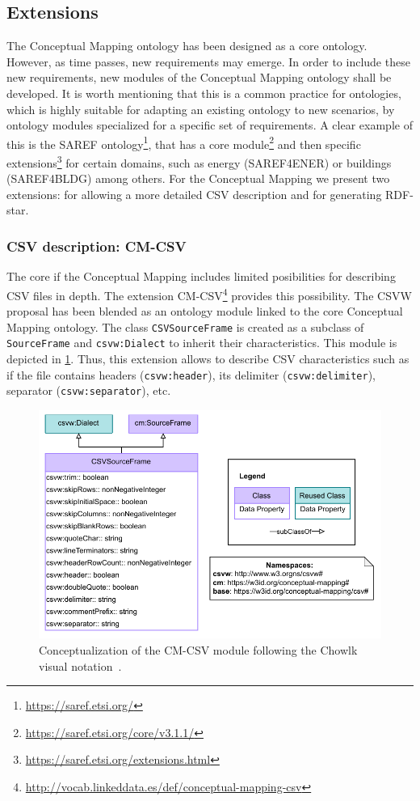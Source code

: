 \subsection{Extensions}

The Conceptual Mapping ontology has been designed as a core ontology. However, as time passes, new requirements may emerge. In order to include these new requirements, new modules of the Conceptual Mapping ontology shall be developed. It is worth mentioning that this is a common practice for ontologies, which is highly suitable for adapting an existing ontology to new scenarios, by ontology modules specialized for a specific set of requirements. A clear example of this is the SAREF ontology\footnote{\url{https://saref.etsi.org/}}, that has a core module\footnote{\url{https://saref.etsi.org/core/v3.1.1/}} and then specific extensions\footnote{\url{https://saref.etsi.org/extensions.html}} for certain domains, such as energy (SAREF4ENER) or buildings (SAREF4BLDG) among others. For the Conceptual Mapping we present two extensions: for allowing a more detailed CSV description and for generating RDF-star.

\subsubsection{CSV description: CM-CSV}
The core if the Conceptual Mapping includes limited posibilities for describing CSV files in depth. The extension CM-CSV\footnote{\url{http://vocab.linkeddata.es/def/conceptual-mapping-csv}} provides this possibility. The CSVW proposal has been blended as an ontology module linked to the core Conceptual Mapping ontology. The class \texttt{CSVSourceFrame} is created as a subclass of \texttt{SourceFrame} and \texttt{csvw:Dialect} to inherit their characteristics. This module is depicted in \cref{fig:chp4-2_csv-ext}. Thus, this extension allows to describe CSV characteristics such as if the file contains headers (\texttt{csvw:header}), its delimiter (\texttt{csvw:delimiter}), separator (\texttt{csvw:separator}), etc. 


\begin{figure}[!t]
\centering
\includegraphics[width=0.8\linewidth]{figures/chp4-2_cm-csv.pdf}
\caption[CM-CSV module]{Conceptualization of the CM-CSV module following the Chowlk visual notation~\citep{feria2022chowlk}.}
\label{fig:chp4-2_csv-ext}
\end{figure}

